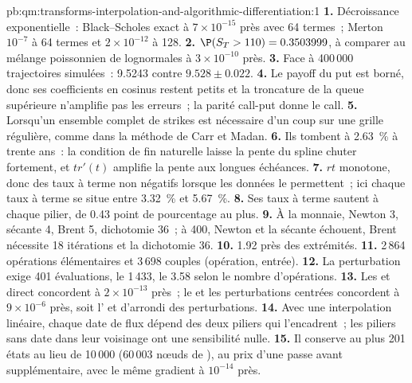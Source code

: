 \begin{solution}{pb:qm:transforms-interpolation-and-algorithmic-differentiation:1}
\textbf{1.} Décroissance exponentielle~: Black--Scholes exact à $7 \times 10^{-15}$ près avec 64 termes~; Merton $10^{-7}$ à 64 termes et $2 \times 10^{-12}$ à 128.
\textbf{2.} $\P(S_T > 110) = 0.3503999$, à comparer au mélange poissonnien de lognormales à $3 \times 10^{-10}$ près.
\textbf{3.} Face à 400\,000 trajectoires simulées~: 9.5243 contre $9.528 \pm 0.022$.
\textbf{4.} Le payoff du put est borné, donc ses coefficients en cosinus restent petits et la troncature de la queue supérieure n'amplifie pas les erreurs~; la parité call-put donne le call.
\textbf{5.} Lorsqu'un ensemble complet de strikes est nécessaire d'un coup sur une grille régulière, comme dans la méthode de Carr et Madan.
\textbf{6.} Ils tombent à 2.63~\% à trente ans~: la condition de fin naturelle laisse la pente du spline chuter fortement, et $tr'(t)$ amplifie la pente aux longues échéances.
\textbf{7.} $rt$ monotone, donc des taux à terme non négatifs lorsque les données le permettent~; ici chaque taux à terme se situe entre 3.32~\% et 5.67~\%.
\textbf{8.} Ses taux à terme sautent à chaque pilier, de 0.43 point de pourcentage au plus.
\textbf{9.} À la monnaie, Newton 3, sécante 4, Brent 5, dichotomie 36~; à 400, Newton et la sécante échouent, Brent nécessite 18 itérations et la dichotomie 36.
\textbf{10.} 1.92 près des extrémités.
\textbf{11.} 2\,864 opérations élémentaires et 3\,698 couples (opération, entrée).
\textbf{12.} La perturbation exige 401 évaluations, le  1\,433, le  3.58 selon le nombre d'opérations.
\textbf{13.} Les  et direct concordent à $2 \times 10^{-13}$ près~; le  et les perturbations centrées concordent à $9 \times 10^{-6}$ près, soit l' et d'arrondi des perturbations.
\textbf{14.} Avec une interpolation linéaire, chaque date de flux dépend des deux piliers qui l'encadrent~; les piliers sans date dans leur voisinage ont une sensibilité nulle.
\textbf{15.} Il conserve au plus 201 états au lieu de 10\,000 (60\,003 nœuds de ), au prix d'une passe avant supplémentaire, avec le même gradient à $10^{-14}$ près.

\end{solution}
